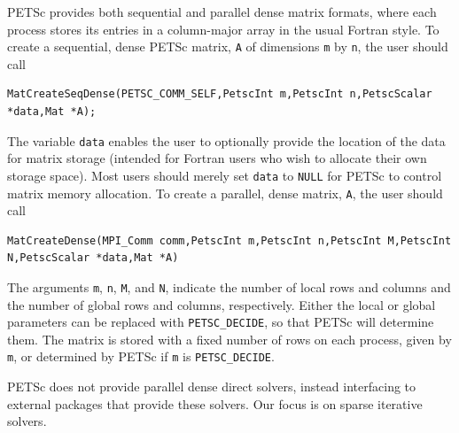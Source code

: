 PETSc provides both sequential and parallel dense matrix formats,
where each process stores its entries in a column-major array in the
usual Fortran style.  To create a sequential, dense PETSc matrix,
\lstinline{A} of dimensions \lstinline{m} by \lstinline{n}, the user should
call
\begin{lstlisting}
MatCreateSeqDense(PETSC_COMM_SELF,PetscInt m,PetscInt n,PetscScalar *data,Mat *A);
\end{lstlisting}
The variable \lstinline{data} enables the user to optionally provide the
location of the data for matrix storage (intended for Fortran users who
wish to allocate their own storage space).  Most users should merely
set \lstinline{data} to \lstinline{NULL} for PETSc to control matrix memory allocation.
To create a parallel, dense matrix, \lstinline{A}, the user should call
\begin{lstlisting}
MatCreateDense(MPI_Comm comm,PetscInt m,PetscInt n,PetscInt M,PetscInt N,PetscScalar *data,Mat *A)
\end{lstlisting}
The arguments \lstinline{m}, \lstinline{n},
\lstinline{M}, and \lstinline{N}, indicate the number of local rows and columns and
the number of global rows and columns, respectively. Either the local or
global parameters can be replaced with \lstinline{PETSC_DECIDE}, so that
PETSc will determine them.
The matrix is stored with a fixed number of rows on
each process, given by \lstinline{m}, or determined by PETSc if \lstinline{m} is
\lstinline{PETSC_DECIDE}.

PETSc does not provide parallel dense direct solvers, instead interfacing to external packages that provide these solvers. Our focus is on sparse iterative solvers.

